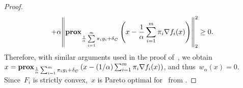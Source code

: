 \documentclass[../../main]{subfiles}
\begin{document}
\begin{proof}
\begin{multline}
                                + \alpha \norm*{\prox_{\frac{1}{\alpha} \sum\limits_{i = 1}^{m} \pi_i g_i + \indicator_C}\left( x - \frac{1}{\alpha} \sum_{i = 1}^{m} \pi_i \nabla f_i(x) \right)}_2^2 \ge 0
                            .\end{multline}
                            Therefore, with similar arguments used in the proof of~, we obtain~$x = \operatorname{\mathbf{prox}}_{\frac{1}{\alpha} \sum_{i = 1}^{m} \pi_i g_i + \operatorname{\delta}_C}\left( x - (1 / \alpha) \sum_{i = 1}^{m} \pi_i \nabla f_i(x) \right)$, and thus~$w_\alpha(x) = 0$.
                            Since~$F_i$ is strictly convex,~$x$ is Pareto optimal for~ from .
                        \end{proof}
                        
\end{document}
